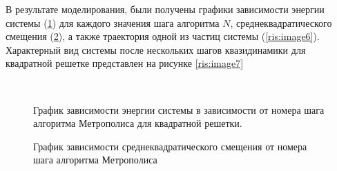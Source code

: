 \documentclass[14pt,a4paper,report]{ncc}
\begin{document}
{ В результате моделирования, были получены графики зависимости энергии системы (\ref{ris:image4})  для каждого значения шага алгоритма $N$, среднеквадратического смещения (\ref{ris:image5}), а также траектория одной из частиц системы (\ref{ris:image6}). Характерный вид системы после нескольких шагов квазидинамики для квадратной решетке представлен на рисунке \ref{ris:image7}


 \
 \begin{figure}[h!]
\caption{График зависимости энергии системы в зависимости от номера шага алгоритма Метрополиса для квадратной решетки.}
\label{ris:image4}
\end{figure}
  \begin{figure}[h!]
\caption{График зависимости среднеквадратического смещения от номера шага алгоритма Метрополиса}
\label{ris:image5}
\end{figure}
  \begin{figure}[h!]

\end{figure}}
\end{document}
